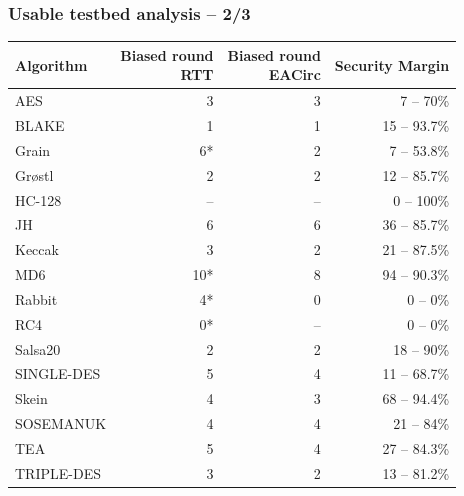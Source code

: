 \documentclass[aspectratio=169]{beamer}
\begin{document}
\begin{frame}
\frametitle{Usable testbed analysis -- 2/3}

\begin{table}
\begin{nomar}
\centering

\scalebox{0.75} {
\begin{tabular}{l || r | r | r }
\textbf{Algorithm} & \thead{Biased round \\ RTT} & \thead{Biased round \\ EACirc} & \textbf{Security Margin} \\ \hline \hline
AES        & 3                          & 3  & 7 -- 70\% \\
BLAKE      & 1                          & 1  & 15 -- 93.7\% \\
Grain      & \cellcolor{green!40}6*     & 2  & 7 -- 53.8\% \\
Gr\o stl   & 2                          & 2  & 12 -- 85.7\% \\
HC-128     & --                         & -- & 0 -- 100\% \\
JH         & 6                          & 6  & 36 -- 85.7\% \\
Keccak     & \cellcolor{green!40}3      & 2  & 21 -- 87.5\% \\
MD6        & \cellcolor{green!40}10*    & 8  & 94 -- 90.3\% \\
Rabbit     & \cellcolor{green!40}4*     & 0  & \cellcolor{red!40}0 -- 0\% \\
RC4        & \cellcolor{green!40}0*     & -- & \cellcolor{red!40}0 -- 0\% \\
Salsa20    & 2                          & 2  & 18 -- 90\% \\
SINGLE-DES & \cellcolor{green!40}5      & 4  & 11 -- 68.7\% \\
Skein      & \cellcolor{green!40}4      & 3  & 68 -- 94.4\% \\
SOSEMANUK  & 4                          & 4  & 21 -- 84\% \\
TEA        & \cellcolor{green!40}5      & 4  & 27 -- 84.3\% \\
TRIPLE-DES & \cellcolor{green!40}3      & 2  & 13 -- 81.2\% \\
\end{tabular}
}
\end{nomar}
\end{table}

\end{frame}

\end{document}
